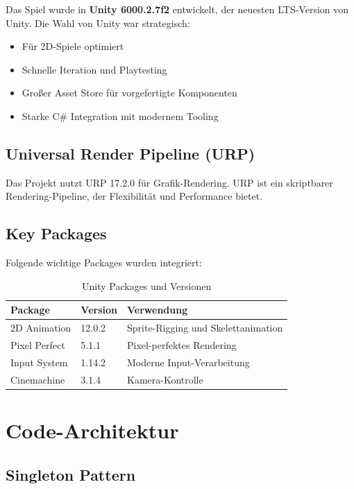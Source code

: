 \documentclass[
  a4paper,
  11pt,
  ngerman,
  parskip=half,
  bibliography=totoc,
  listof=totoc
]{scrreprt}
\begin{document}
Das Spiel wurde in \textbf{Unity 6000.2.7f2} \cite{unity_engine} entwickelt, der neuesten LTS-Version von Unity. Die Wahl von Unity war strategisch:

\begin{itemize}
    \item Für 2D-Spiele optimiert
    \item Schnelle Iteration und Playtesting
    \item Großer Asset Store für vorgefertigte Komponenten
    \item Starke C\# Integration mit modernem Tooling
\end{itemize}

\subsection{Universal Render Pipeline (URP)}

Das Projekt nutzt \ac{URP} 17.2.0 \cite{unity_urp_2024} für Grafik-Rendering. \ac{URP} ist ein skriptbarer Rendering-Pipeline, der Flexibilität und Performance bietet.

\subsection{Key Packages}

Folgende wichtige Packages wurden integriert:

\begin{table}[h]
\centering
\caption{Unity Packages und Versionen}
\label{tab:unity_packages}
\begin{tabular}{|l|l|l|}
\hline
\textbf{Package} & \textbf{Version} & \textbf{Verwendung} \\
\hline
2D Animation & 12.0.2 & Sprite-Rigging und Skelettanimation \\
Pixel Perfect & 5.1.1 & Pixel-perfektes Rendering \\
Input System & 1.14.2 & Moderne Input-Verarbeitung \\
Cinemachine & 3.1.4 & Kamera-Kontrolle \\
\hline
\end{tabular}
\end{table}

\section{Code-Architektur}

\subsection{Singleton Pattern}
\end{document}
